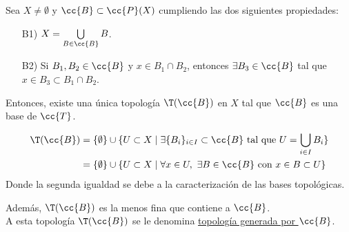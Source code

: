 \begin{teo}\label{teo:TopoGenerada_Bases}
    Sea $X\neq \emptyset$ y $\cc{B}\subset \cc{P}(X)$ cumpliendo las dos siguientes propiedades:
    \begin{enumerate}
        \item[B1)] $X=\bigcup\limits_{B\in \cc{B}} B$.
        \item[B2)] Si $B_1, B_2\in \cc{B}$ y $x\in B_1\cap B_2$, entonces $\exists B_3\in \cc{B}$ tal que $x\in B_3\subset B_1\cap B_2$.
    \end{enumerate}

    Entonces, existe una única topología $\T(\cc{B})$ en $X$ tal que $\cc{B}$ es una base de $\cc{T}$.

    \begin{equation*}\begin{split}
        \T(\cc{B}) &= \{\emptyset\}\cup \{U\subset X\mid \exists \{B_i\}_{i\in I}\subset \cc{B} \text{ tal que }U=\bigcup_{i\in I} B_i\} \\
        &= \{\emptyset\} \cup \{U\subset X\mid \forall x\in U,~\exists B\in \cc{B} \text{ con } x\in B\subset U\}
    \end{split}\end{equation*}
    Donde la segunda igualdad se debe a la caracterización de las bases topológicas.

    Además, $\T(\cc{B})$ es la menos fina que contiene a $\cc{B}$.\\

    A esta topología $\T(\cc{B})$ se le denomina \ul{topología generada por $\cc{B}$}.
\end{teo}

